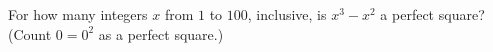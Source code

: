 For how many integers $x$ from $1$ to $100$, inclusive, is $x^3-x^2$ a perfect square? (Count $0=0^2$ as a perfect square.)
